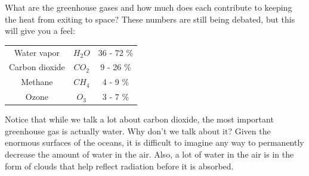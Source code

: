 What are the greenhouse gases and how much does each contribute to
keeping the heat from exiting to space?  These numbers are still being
debated, but this will give you a feel:
\begin{tabular}{c | c | c}
  Water vapor & $H_2O$ & 36 - 72 \% \\
  Carbon dioxide & $CO_2$ & 9 - 26 \% \\
  Methane & $CH_4$ & 4 - 9 \% \\
  Ozone & $O_3$ & 3 - 7 \%
\end{tabular}

Notice that while we talk a lot about carbon dioxide, the most
important greenhouse gas is actually water.  Why don't we talk about
it? Given the enormous surfaces of the oceans, it is difficult to
imagine any way to permanently decrease the amount of water in the
air. Also, a lot of water in the air is in the form of clouds that
help reflect radiation before it is absorbed.

